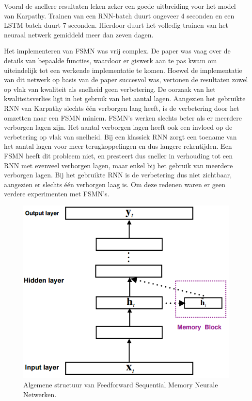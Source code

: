 Vooral de snellere resultaten leken zeker een goede uitbreiding voor het model van Karpathy. Trainen van een RNN-batch duurt ongeveer 4 seconden en een LSTM-batch duurt 7 seconden. Hierdoor duurt het volledig trainen van het neuraal netwerk gemiddeld meer dan zeven dagen.

Het implementeren van FSMN was vrij complex. De paper was vaag over de details van bepaalde functies, waardoor er giswerk aan te pas kwam om uiteindelijk tot een werkende implementatie te komen. 
Hoewel de implementatie van dit netwerk op basis van de paper succesvol was, vertonen de resultaten zowel op vlak van kwaliteit als snelheid geen verbetering. De oorzaak van het kwaliteitsverlies ligt in het gebruik van het aantal lagen. Aangezien het gebruikte RNN van Karpathy slechts \'e\'en verborgen laag heeft, is de verbetering door het omzetten naar een FSMN miniem. FSMN's werken slechts beter als er meerdere verborgen lagen zijn. Het aantal verborgen lagen heeft ook een invloed op de verbetering op vlak van snelheid. Bij een klassiek RNN zorgt een toename van het aantal lagen voor meer terugkoppelingen en dus langere rekentijden. Een FSMN heeft dit probleem niet, en presteert dus sneller in verhouding tot een RNN met evenveel verborgen lagen, maar enkel bij het gebruik van meerdere verborgen lagen. Bij het gebruikte RNN is de verbetering dus niet zichtbaar, aangezien er slechts \'e\'en verborgen laag is. Om deze redenen waren er geen verdere experimenten met FSMN's.

\begin{figure}[tb]
	\centering
	\includegraphics[width=0.6\linewidth]{Images/fsmn_ours}
	\caption{Algemene structuur van Feedforward Sequential Memory Neurale Netwerken.}
	\label{fig:fsmn}
\end{figure}

